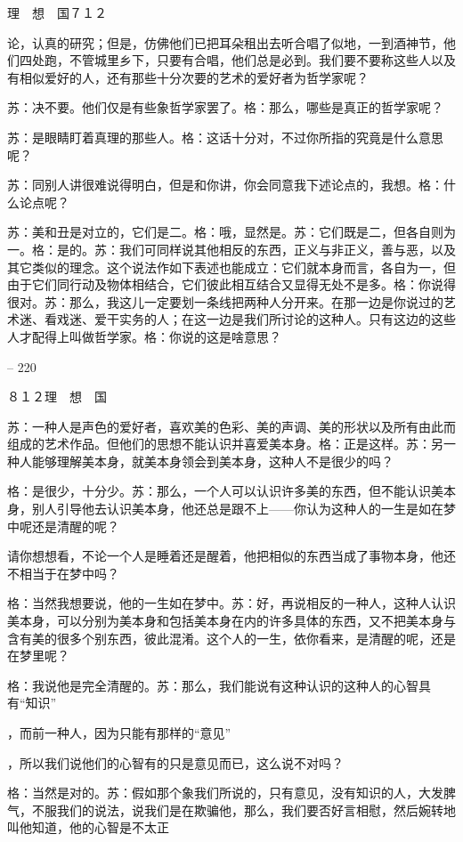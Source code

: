 \documentclass[11pt,oneside]{book}
\begin{document}
\begin{common-format}
    理　想　国７１２

    论，认真的研究；但是，仿佛他们已把耳朵租出去听合唱了似地，一到酒神节，他们四处跑，不管城里乡下，只要有合唱，他们总是必到。我们要不要称这些人以及有相似爱好的人，还有那些十分次要的艺术的爱好者为哲学家呢？

    苏：决不要。他们仅是有些象哲学家罢了。格：那么，哪些是真正的哲学家呢？

    苏：是眼睛盯着真理的那些人。格：这话十分对，不过你所指的究竟是什么意思呢？

    苏：同别人讲很难说得明白，但是和你讲，你会同意我下述论点的，我想。格：什么论点呢？

    苏：美和丑是对立的，它们是二。格：哦，显然是。苏：它们既是二，但各自则为一。格：是的。苏：我们可同样说其他相反的东西，正义与非正义，善与恶，以及其它类似的理念。这个说法作如下表述也能成立：它们就本身而言，各自为一，但由于它们同行动及物体相结合，它们彼此相互结合又显得无处不是多。格：你说得很对。苏：那么，我这儿一定要划一条线把两种人分开来。在那一边是你说过的艺术迷、看戏迷、爱干实务的人；在这一边是我们所讨论的这种人。只有这边的这些人才配得上叫做哲学家。格：你说的这是啥意思？

    

-- 220

    ８１２理　想　国

    苏：一种人是声色的爱好者，喜欢美的色彩、美的声调、美的形状以及所有由此而组成的艺术作品。但他们的思想不能认识并喜爱美本身。格：正是这样。苏：另一种人能够理解美本身，就美本身领会到美本身，这种人不是很少的吗？

    格：是很少，十分少。苏：那么，一个人可以认识许多美的东西，但不能认识美本身，别人引导他去认识美本身，他还总是跟不上——你认为这种人的一生是如在梦中呢还是清醒的呢？

    请你想想看，不论一个人是睡着还是醒着，他把相似的东西当成了事物本身，他还不相当于在梦中吗？

    格：当然我想要说，他的一生如在梦中。苏：好，再说相反的一种人，这种人认识美本身，可以分别为美本身和包括美本身在内的许多具体的东西，又不把美本身与含有美的很多个别东西，彼此混淆。这个人的一生，依你看来，是清醒的呢，还是在梦里呢？

    格：我说他是完全清醒的。苏：那么，我们能说有这种认识的这种人的心智具有“知识”

    ，而前一种人，因为只能有那样的“意见”

    ，所以我们说他们的心智有的只是意见而已，这么说不对吗？

    格：当然是对的。苏：假如那个象我们所说的，只有意见，没有知识的人，大发脾气，不服我们的说法，说我们是在欺骗他，那么，我们要否好言相慰，然后婉转地叫他知道，他的心智是不太正


\end{common-format}
\end{document}
